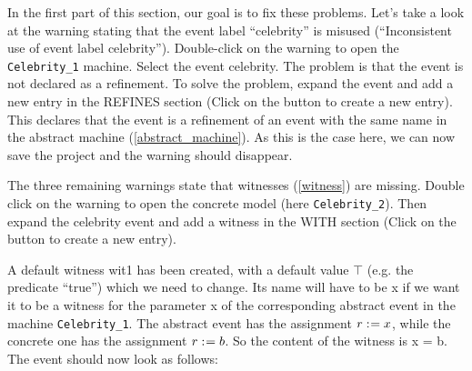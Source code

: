 In the first part of this section, our goal is to fix these problems. Let's take a look at the warning stating that the event label ``celebrity'' is misused (``Inconsistent use of event label celebrity''). Double-click on the warning to open the \texttt{Celebrity\_1} machine. Select the event \textsf{celebrity}. The problem is that the event is not declared as a refinement. To solve the problem, expand the event and add a new entry in the \textsf{REFINES} section (Click on the  button to create a new entry). This declares that the event is a refinement of an event with the same name in the abstract machine (\ref{abstract_machine}). As this is the case here, we can now save the project and the warning should disappear.


The three remaining warnings state that witnesses (\ref{witness}) are missing. Double click on the warning to open the concrete model (here \texttt{Celebrity\_2}). Then expand the \textsf{celebrity} event and add a witness in the \textsf{WITH} section (Click on the  button to create a new entry).

A default witness \textsf{wit1} has been created, with a default value \textsf{$\top$} (e.g. the predicate ``true'') which we need to change. Its name will have to be \textsf{x} if we want it to be a witness for the parameter \textsf{x} of the corresponding abstract event in the machine \texttt{Celebrity\_1}. The abstract event has the assignment \textsf{$r \mathrel{:\mkern1mu=} x$}, while the concrete one has the assignment \textsf{$r \mathrel{:\mkern1mu=} b$}. So the content of the witness is \textsf{x = b}. The event should now look as follows: 

\begin{description}
		\begin{description}
		\WhenGrd
			\begin{description}
			\end{description}
		\Witnesses
			\begin{description}
			\nItem{ x }{ x=b }
			\end{description}
		\ThenAct
			\begin{description}
			\nItemX{ act1 }{ r :=  b }
			\end{description}
		\EndAct
		\end{description}
\end{description}

